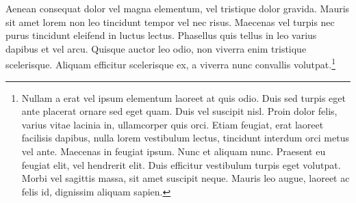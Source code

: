 Aenean consequat dolor vel magna elementum, vel tristique dolor gravida. Mauris sit amet lorem non leo tincidunt tempor vel nec risus. Maecenas vel turpis nec purus tincidunt eleifend in luctus lectus. Phasellus quis tellus in leo varius dapibus et vel arcu. Quisque auctor leo odio, non viverra enim tristique scelerisque. Aliquam efficitur scelerisque ex, a viverra nunc convallis volutpat.\footnote{Nullam a erat vel ipsum elementum laoreet at quis odio. Duis sed turpis eget ante placerat ornare sed eget quam. Duis vel suscipit nisl. Proin dolor felis, varius vitae lacinia in, ullamcorper quis orci. Etiam feugiat, erat laoreet facilisis dapibus, nulla lorem vestibulum lectus, tincidunt interdum orci metus vel ante. Maecenas in feugiat ipsum. Nunc et aliquam nunc. Praesent eu feugiat elit, vel hendrerit elit. Duis efficitur vestibulum turpis eget volutpat. Morbi vel sagittis massa, sit amet suscipit neque. Mauris leo augue, laoreet ac felis id, dignissim aliquam sapien.}



